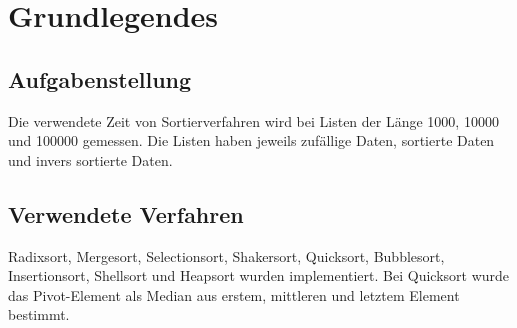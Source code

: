 \chapter{Grundlegendes}
\section{Aufgabenstellung}
Die verwendete Zeit von Sortierverfahren wird bei Listen der Länge 1000, 10000 und 100000 gemessen. Die Listen haben jeweils zufällige Daten, sortierte Daten und invers sortierte Daten.
\section{Verwendete Verfahren}
Radixsort, Mergesort, Selectionsort, Shakersort, Quicksort, Bubblesort, Insertionsort, Shellsort und Heapsort wurden implementiert. Bei Quicksort wurde das Pivot-Element als Median aus erstem, mittleren und letztem Element bestimmt.
